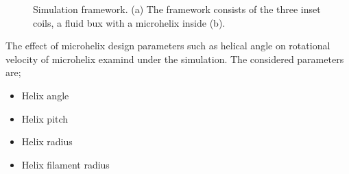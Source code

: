 \documentclass[12pt,a4paper,titlepage]{report}
\begin{document}
\begin{figure}
        \caption[Simulation framework]{Simulation framework. (a) The framework consists of the three inset coils,
a fluid bux with a microhelix inside (b).}\label{Simulation framework}

       

\end{figure}

The effect of microhelix design parameters such as helical angle on rotational velocity of microhelix examind
under the simulation. The considered parameters are;
  
\begin{itemize}
  \item Helix angle
  \item Helix pitch
  \item Helix radius
  \item Helix filament radius
\end{itemize}
\end{document}
